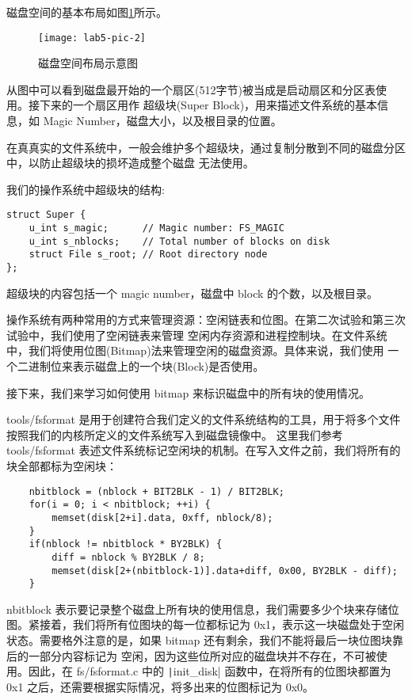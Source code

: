 磁盘空间的基本布局如图\ref{lab5-pic-2}所示。

\begin{figure}[htbp]
  \centering
  \texttt{[image: lab5-pic-2]}
  \caption{磁盘空间布局示意图}\label{lab5-pic-2}
\end{figure}

从图中可以看到磁盘最开始的一个扇区(512字节)被当成是启动扇区和分区表使用。接下来的一个扇区用作
超级块(Super Block)，用来描述文件系统的基本信息，如 Magic Number，磁盘大小，以及根目录的位置。

\begin{note}
在真真实的文件系统中，一般会维护多个超级块，通过复制分散到不同的磁盘分区中，以防止超级块的损坏造成整个磁盘
无法使用。
\end{note}

我们的操作系统中超级块的结构:

\begin{verbatim}
struct Super {
    u_int s_magic;      // Magic number: FS_MAGIC
    u_int s_nblocks;    // Total number of blocks on disk
    struct File s_root; // Root directory node
};
\end{verbatim}

超级块的内容包括一个 magic number，磁盘中 block 的个数，以及根目录。

操作系统有两种常用的方式来管理资源：空闲链表和位图。在第二次试验和第三次试验中，我们使用了空闲链表来管理
空闲内存资源和进程控制块。在文件系统中，我们将使用位图(Bitmap)法来管理空闲的磁盘资源。具体来说，我们使用
一个二进制位来表示磁盘上的一个块(Block)是否使用。

接下来，我们来学习如何使用 bitmap 来标识磁盘中的所有块的使用情况。

tools/fsformat 是用于创建符合我们定义的文件系统结构的工具，用于将多个文件按照我们的内核所定义的文件系统写入到磁盘镜像中。
这里我们参考 tools/fsformat 表述文件系统标记空闲块的机制。在写入文件之前，我们将所有的块全部都标为空闲块：

\begin{verbatim}
    nbitblock = (nblock + BIT2BLK - 1) / BIT2BLK;
    for(i = 0; i < nbitblock; ++i) {
        memset(disk[2+i].data, 0xff, nblock/8);
    }
    if(nblock != nbitblock * BY2BLK) {
        diff = nblock % BY2BLK / 8;
        memset(disk[2+(nbitblock-1)].data+diff, 0x00, BY2BLK - diff);
    }
\end{verbatim}

nbitblock 表示要记录整个磁盘上所有块的使用信息，我们需要多少个块来存储位图。紧接着，我们将所有位图块的每一位都标记为
0x1，表示这一块磁盘处于空闲状态。需要格外注意的是，如果 bitmap 还有剩余，我们不能将最后一块位图块靠后的一部分内容标记为
空闲，因为这些位所对应的磁盘块并不存在，不可被使用。因此，在 fs/fsformat.c 中的 \texttt|init_disk|
函数中，在将所有的位图块都置为 0x1 之后，还需要根据实际情况，将多出来的位图标记为 0x0。

